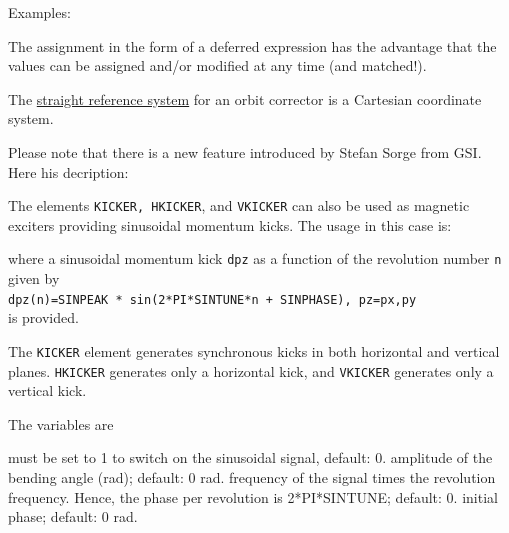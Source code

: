  Examples:

The assignment in the form of a deferred expression has the advantage
that the values can be assigned and/or modified at any time (and
matched!).

The \hyperref[subsec:local-straight]{straight reference system} for an
orbit corrector is a Cartesian coordinate system.


Please note that there is a new feature introduced by Stefan Sorge from
GSI. Here his decription:

The elements \texttt{KICKER, HKICKER}, and \texttt{VKICKER} can also be used as
magnetic exciters providing sinusoidal momentum kicks. The usage in this case
is:

where a sinusoidal momentum kick \texttt{dpz} as a function of the  revolution
number \texttt{n} given by\\
\texttt{dpz(n)=SINPEAK * sin(2*PI*SINTUNE*n + SINPHASE), pz=px,py} \\
is provided.

The \texttt{KICKER} element generates synchronous kicks in both horizontal and
vertical planes. \texttt{HKICKER} generates only a horizontal kick, and
\texttt{VKICKER} generates only a vertical kick.

The variables are

\begin{madlist}
    must be set to 1 to switch on the sinusoidal
     signal, default: 0.
    amplitude of the bending angle (rad); default: 0
     rad.
    frequency of the signal times the revolution
     frequency.  Hence, the phase per revolution is 2*PI*SINTUNE;
     default: 0.
    initial phase; default: 0 rad.
\end{madlist}

